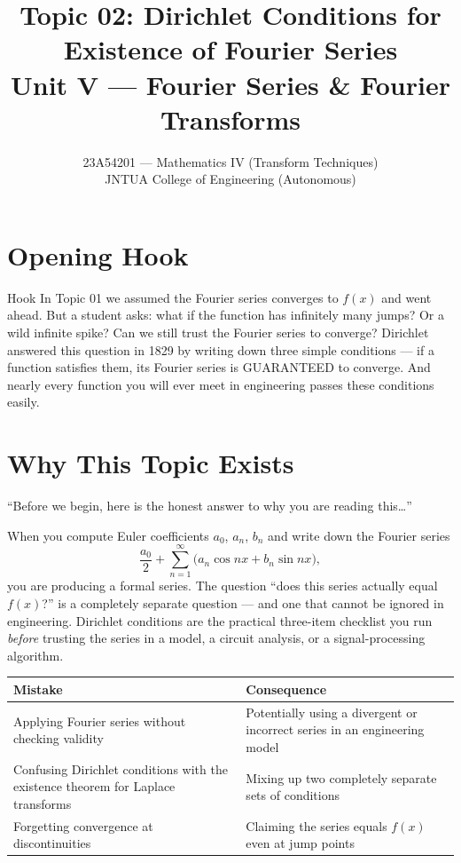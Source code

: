 \documentclass[12pt,a4paper]{article}
\title{Topic 02: Dirichlet Conditions for Existence of Fourier Series \\
       \large Unit V --- Fourier Series \& Fourier Transforms}
\author{23A54201 --- Mathematics IV (Transform Techniques) \\
        JNTUA College of Engineering (Autonomous)}
\date{}
\begin{document}
\maketitle
\tableofcontents
\newpage

\section{Opening Hook}

\begin{curiositybox}{Hook}
In Topic 01 we assumed the Fourier series converges to $f(x)$ and went ahead. But a student asks: what if the function has infinitely many jumps? Or a wild infinite spike? Can we still trust the Fourier series to converge? Dirichlet answered this question in 1829 by writing down three simple conditions --- if a function satisfies them, its Fourier series is GUARANTEED to converge. And nearly every function you will ever meet in engineering passes these conditions easily.
\end{curiositybox}

\section{Why This Topic Exists}

``Before we begin, here is the honest answer to why you are reading this\ldots''

When you compute Euler coefficients $a_0$, $a_n$, $b_n$ and write down the Fourier series
\[
   \frac{a_0}{2} + \sum_{n=1}^{\infty}\bigl(a_n \cos nx + b_n \sin nx\bigr),
\]
you are producing a formal series. The question ``does this series actually equal $f(x)$?'' is a completely separate question --- and one that cannot be ignored in engineering.
Dirichlet conditions are the practical three-item checklist you run \emph{before} trusting the series in a model, a circuit analysis, or a signal-processing algorithm.

\medskip
\begin{center}
\begin{tabular}{@{}p{7cm}p{7cm}@{}}
\toprule
\textbf{Mistake} & \textbf{Consequence} \\
\midrule
Applying Fourier series without checking validity
  & Potentially using a divergent or incorrect series in an engineering model \\
\midrule
Confusing Dirichlet conditions with the existence theorem for Laplace transforms
  & Mixing up two completely separate sets of conditions \\
\midrule
Forgetting convergence at discontinuities
  & Claiming the series equals $f(x)$ even at jump points \\
\bottomrule
\end{tabular}
\end{center}
\end{document}
